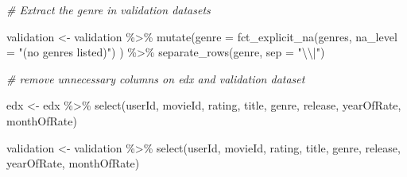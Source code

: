 \documentclass[
]{article}
\newenvironment{Shaded}{}{}
\newcommand{\AttributeTok}[1]{\textcolor[rgb]{0.49,0.56,0.16}{#1}}
\newcommand{\CommentTok}[1]{\textcolor[rgb]{0.38,0.63,0.69}{\textit{#1}}}
\newcommand{\FunctionTok}[1]{\textcolor[rgb]{0.02,0.16,0.49}{#1}}
\newcommand{\NormalTok}[1]{#1}
\newcommand{\OtherTok}[1]{\textcolor[rgb]{0.00,0.44,0.13}{#1}}
\newcommand{\SpecialCharTok}[1]{\textcolor[rgb]{0.25,0.44,0.63}{#1}}
\newcommand{\StringTok}[1]{\textcolor[rgb]{0.25,0.44,0.63}{#1}}
\begin{document}
\begin{Shaded}
\begin{Highlighting}[]
\CommentTok{\# Extract the genre in validation datasets}

\NormalTok{validation }\OtherTok{\textless{}{-}}\NormalTok{ validation }\SpecialCharTok{\%\textgreater{}\%}
   \FunctionTok{mutate}\NormalTok{(}\AttributeTok{genre =} \FunctionTok{fct\_explicit\_na}\NormalTok{(genres,}
                                       \AttributeTok{na\_level =} \StringTok{"(no genres listed)"}\NormalTok{)}
\NormalTok{          ) }\SpecialCharTok{\%\textgreater{}\%}
   \FunctionTok{separate\_rows}\NormalTok{(genre,}
                 \AttributeTok{sep =} \StringTok{"}\SpecialCharTok{\textbackslash{}\textbackslash{}}\StringTok{|"}\NormalTok{)}
\end{Highlighting}
\end{Shaded}

\begin{Shaded}
\begin{Highlighting}[]
\CommentTok{\# remove unnecessary columns on edx and validation dataset}

\NormalTok{edx }\OtherTok{\textless{}{-}}\NormalTok{ edx }\SpecialCharTok{\%\textgreater{}\%} \FunctionTok{select}\NormalTok{(userId, movieId, rating, title, genre, release, yearOfRate, monthOfRate)}

\NormalTok{validation }\OtherTok{\textless{}{-}}\NormalTok{ validation }\SpecialCharTok{\%\textgreater{}\%} \FunctionTok{select}\NormalTok{(userId, movieId, rating, title, genre, release, yearOfRate, monthOfRate)}
\end{Highlighting}
\end{Shaded}

\begin{Shaded}
\end{Shaded}
\end{document}

